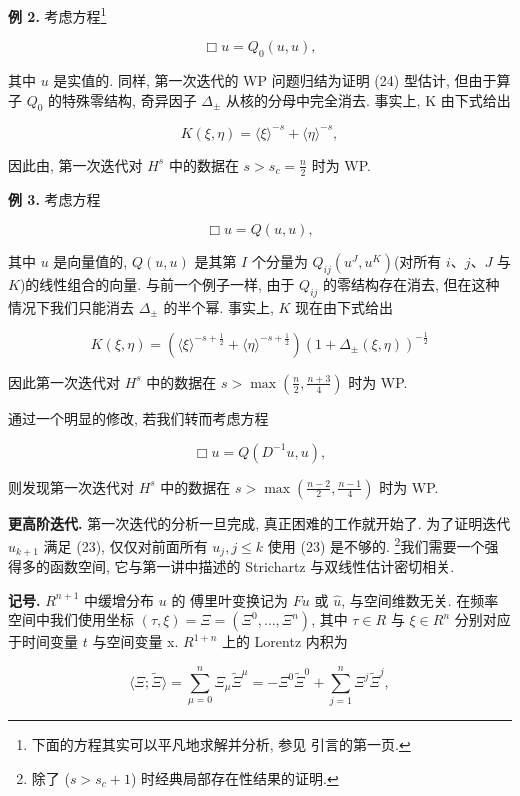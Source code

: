 \textbf{例 2.} 考虑方程\footnote{下面的方程其实可以平凡地求解并分析, 参见 \cite{gfref31} 引言的第一页.}

\[
\Box u = Q _ {0} (u,  u), 
\]

其中 $u$ 是实值的. 同样, 第一次迭代的 WP 问题归结为证明 (24) 型估计, 但由于算子 $Q_{0}$ 的特殊零结构, 奇异因子 $\Delta_{\pm}$ 从核的分母中完全消去. 事实上, K 由下式给出

\[
K (\xi ,  \eta) = \langle \xi \rangle ^ {- s} + \langle \eta \rangle ^ {- s}, 
\]

因此由, 第一次迭代对 $H^{s}$ 中的数据在 $s > s_{c} = \frac{n}{2}$ 时为 WP. 

\textbf{例 3.} 考虑方程

\[
\Box u = Q (u,  u), 
\]

其中 $u$ 是向量值的, $Q(u, u)$ 是其第 $I$ 个分量为 $Q_{ij}(u^{J}, u^{K})$(对所有 $i$、$j$、$J$ 与 $K$)的线性组合的向量. 与前一个例子一样, 由于 $Q_{ij}$ 的零结构存在消去, 但在这种情况下我们只能消去 $\Delta_{\pm}$ 的半个幂. 事实上, $K$ 现在由下式给出

\[
K (\xi ,  \eta) = \left(\langle \xi \rangle ^ {- s + \frac {1}{2}} + \langle \eta \rangle ^ {- s + \frac {1}{2}}\right) \left(1 + \Delta_ {\pm} (\xi ,  \eta)\right) ^ {- \frac {1}{2}}
\]

因此第一次迭代对 $H^s$ 中的数据在 $s > \max \left( \frac{n}{2},  \frac{n + 3}{4} \right)$ 时为 WP. 

通过一个明显的修改, 若我们转而考虑方程

\[
\Box u = Q (D ^ {- 1} u,  u), 
\]

则发现第一次迭代对 $H^{s}$ 中的数据在 $s > \max\left(\frac{n-2}{2},  \frac{n-1}{4}\right)$ 时为 WP. 

\textbf{更高阶迭代.} 第一次迭代的分析一旦完成, 真正困难的工作就开始了. 为了证明迭代 $u_{k+1}$ 满足 (23), 仅仅对前面所有 $u_{j},  j \leq k$ 使用 (23) 是不够的. \footnote{除了 ($s > s_c + 1$) 时经典局部存在性结果的证明.}我们需要一个强得多的函数空间, 它与第一讲中描述的 Strichartz 与双线性估计密切相关. 

\textbf{记号.} $R^{n+1}$ 中缓增分布 $u$ 的 傅里叶变换记为 $Fu$ 或 $\widehat{u}$, 与空间维数无关. 在频率空间中我们使用坐标 $(\tau,  \xi) = \Xi = (\Xi^{0},  \ldots,  \Xi^{n})$, 其中 $\tau \in R$ 与 $\xi \in R^{n}$ 分别对应于时间变量 $t$ 与空间变量 x. $R^{1+n}$ 上的 Lorentz 内积为

\[
\langle \Xi ;  \widetilde {\Xi} \rangle = \sum_ {\mu = 0} ^ {n} \Xi_ {\mu} \widetilde {\Xi} ^ {\mu} = - \Xi^ {0} \widetilde {\Xi} ^ {0} + \sum_ {j = 1} ^ {n} \Xi^ {j} \widetilde {\Xi} ^ {j}, 
\]

